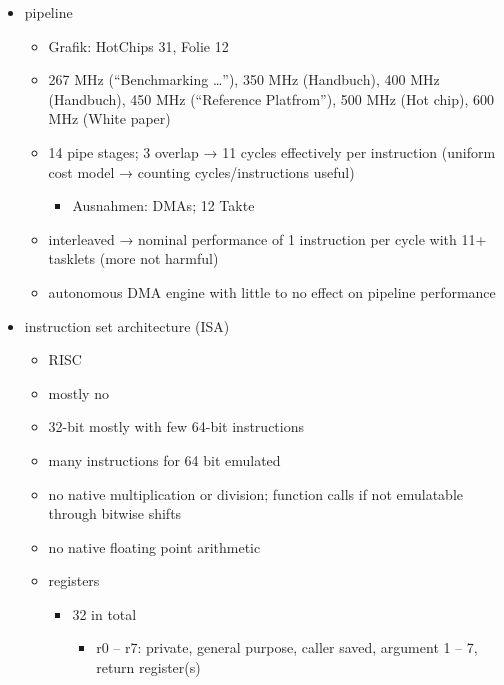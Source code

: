 \begin{itemize}
	\item
	pipeline
	\begin{itemize}
		\item
		Grafik:
		HotChips 31, Folie 12

		\item
		267 MHz (\enquote{Benchmarking …}), 350 MHz (Handbuch), 400 MHz (Handbuch), 450 MHz (\enquote{Reference Platfrom}), 500 MHz (Hot chip), 600 MHz (White paper)

		\item
		14 pipe stages; 3 overlap → 11 cycles effectively per instruction (uniform cost model → counting cycles/instructions useful)
		\begin{itemize}
			\item
			Ausnahmen:
			DMAs;
			12 Takte
		\end{itemize}

		\item
		interleaved → nominal performance of 1 instruction per cycle with 11+ tasklets (more not harmful)

		\item
		autonomous DMA engine with little to no effect on pipeline performance
	\end{itemize}

	\item
	instruction set architecture (ISA)
	\begin{itemize}
		\item
		RISC

		\item
		mostly no

		\item
		32-bit mostly with few 64-bit instructions

		\item
		many instructions for 64 bit emulated

		\item
		no native multiplication or division;
		function calls if not emulatable through bitwise shifts

		\item
		no native floating point arithmetic

		\item
		registers
		\begin{itemize}
			\item
			32 in total
			\begin{itemize}
				\item
				r0 -- r7:
				private,
				general purpose,
				caller saved,
				argument 1 -- 7,
				return register(s)


\end{itemize}
\end{itemize}
\end{itemize}
\end{itemize}
